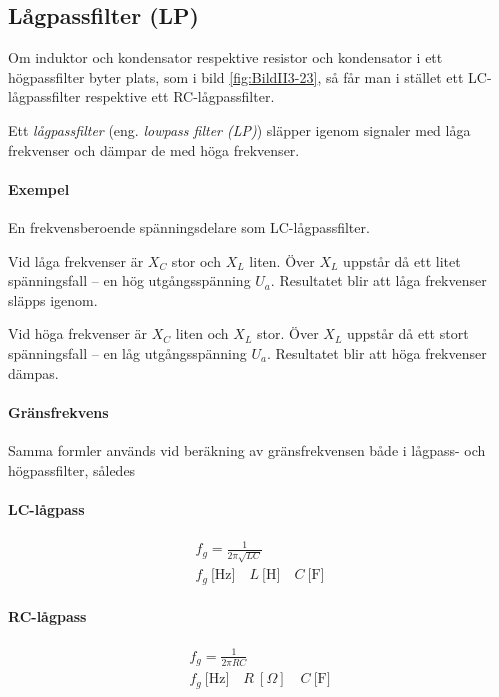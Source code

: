 \subsection{Lågpassfilter (LP)}
\label{lågpassfilter}


Om induktor och kondensator respektive resistor och kondensator i ett
högpassfilter byter plats, som i bild \ref{fig:BildII3-23}, så får man i
stället ett LC-lågpassfilter respektive ett RC-lågpassfilter.

Ett \emph{lågpassfilter} (eng. \emph{lowpass filter (LP)}) släpper igenom
signaler med låga frekvenser och dämpar de med höga frekvenser.

\paragraph{Exempel} En frekvensberoende spänningsdelare som LC-lågpassfilter.

Vid låga frekvenser är \(X_C\) stor och \(X_L\) liten.
Över \(X_L\) uppstår då ett litet spänningsfall -- en hög utgångsspänning
\(U_a\).
Resultatet blir att låga frekvenser släpps igenom.

Vid höga frekvenser är \(X_C\) liten och \(X_L\) stor.
Över \(X_L\) uppstår då ett stort spänningsfall -- en låg utgångsspänning
\(U_a\).
Resultatet blir att höga frekvenser dämpas.

\paragraph{Gränsfrekvens}

Samma formler används vid beräkning av gränsfrekvensen både i lågpass- och
högpassfilter, således

\paragraph{LC-lågpass}
\begin{gather*}
  f_g = \frac{1}{2\pi \sqrt{LC}} \\
  f_g\ \text{[Hz]} \quad L\ \text{[H]} \quad C\ \text{[F]}
\end{gather*}

\paragraph{RC-lågpass}
\begin{gather*}
  f_g = \frac{1}{2\pi {RC}} \\
  f_g\ \text{[Hz]} \quad R\ [\Omega] \quad C\ \text{[F]}
\end{gather*}

